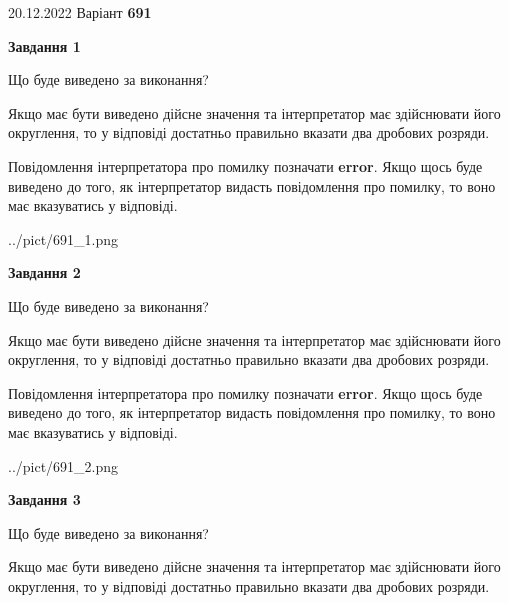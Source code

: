 \documentclass[12pt, ukrainian]{article}
\begin{document}
{20.12.2022 Варіант \No \textbf { 691 }\par}
{
\begin {Large}

{\begin {center}\textbf{Завдання 1}\end {center}}\par
Що буде виведено за виконання? \par

Якщо має бути виведено дійсне значення та інтерпретатор має здійснювати його округлення, 
то у відповіді достатньо правильно вказати два дробових розряди.

Повідомлення інтерпретатора про помилку позначати \textbf{error}.
Якщо щось буде виведено до того, як інтерпретатор видасть повідомлення про помилку, 
то воно має вказуватись у відповіді. \par

\begin{center}
	{../pict/691_1.png}
\end{center}
\newpage

{\begin {center}\textbf{Завдання 2}\end {center}}\par
Що буде виведено за виконання? \par

Якщо має бути виведено дійсне значення та інтерпретатор має здійснювати його округлення, 
то у відповіді достатньо правильно вказати два дробових розряди.

Повідомлення інтерпретатора про помилку позначати \textbf{error}.
Якщо щось буде виведено до того, як інтерпретатор видасть повідомлення про помилку, 
то воно має вказуватись у відповіді. \par

\begin{center}
	{../pict/691_2.png}
\end{center}
\newpage

{\begin {center}\textbf{Завдання 3}\end {center}}\par
Що буде виведено за виконання? \par

Якщо має бути виведено дійсне значення та інтерпретатор має здійснювати його округлення, 
то у відповіді достатньо правильно вказати два дробових розряди.


\end{Large}}
\end{document}
